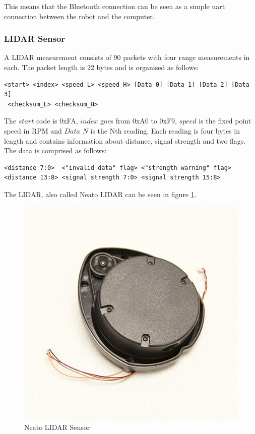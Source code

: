This means that the Bluetooth connection can be seen as a simple uart connection between the robot and the computer. 

\subsubsection{LIDAR Sensor}
A LIDAR measurement consists of 90 packets with four range measurements in each. The packet length is 22 bytes and is organised as follows\cite{LIDAR}:
\begin{verbatim}
<start> <index> <speed_L> <speed_H> [Data 0] [Data 1] [Data 2] [Data 3]
 <checksum_L> <checksum_H>
\end{verbatim}
The $start$ code is 0xFA, $index$ goes from 0xA0 to 0xF9, $speed$ is the fixed point speed in RPM and $Data$ $N$ is the Nth reading. Each reading is four bytes in length and contains information about distance, signal strength and two flags. The data is comprised as follows:
\begin{verbatim}
<distance 7:0>  <"invalid data" flag> <"strength warning" flag> 
<distance 13:8> <signal strength 7:0> <signal strength 15:8>
\end{verbatim}
The LIDAR, also called Neato LIDAR can be seen in figure \ref{fig:NeatoLidar}.
\begin{figure}[H]
\centering
\includegraphics[scale=1]{billeder/NeatoLidar}
\caption{Neato LIDAR Sensor}
\label{fig:NeatoLidar}
\end{figure}
